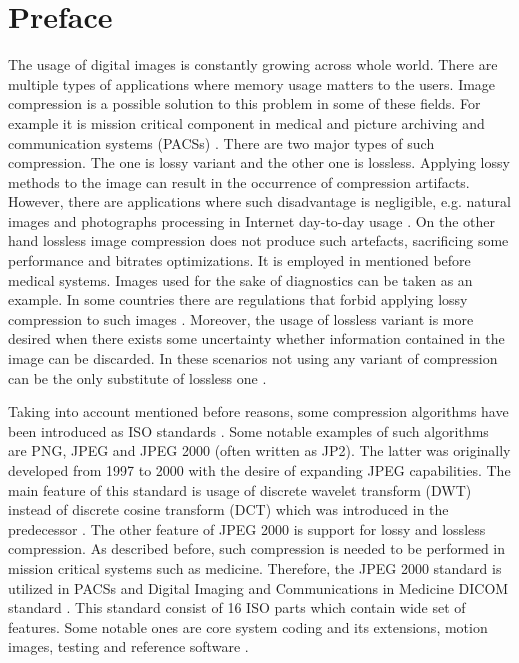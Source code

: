 \section{Preface}

The usage of digital images is constantly growing across whole world. There are multiple types
of applications where memory usage matters to the users. Image compression is a possible solution
to this problem in some of these fields. For example it is mission critical component in medical
and picture archiving and communication systems (PACSs) \cite{entropy}. There are two major types
of such compression. The one is lossy variant and the other one is lossless. Applying lossy methods
to the image can result in the occurrence of compression artifacts. However, there are applications
where such disadvantage is negligible, e.g. natural images and photographs processing in Internet day-to-day usage \cite{img_compress}.
On the other hand lossless image compression does not produce such artefacts,
sacrificing some performance and bitrates optimizations. It is employed in mentioned before medical systems.
Images used for the sake of diagnostics can be taken as an example. In some countries there are
regulations that forbid applying lossy compression to such images \cite{entropy}. Moreover, the
usage of lossless variant is more desired when there exists some uncertainty whether information
contained in the image can be discarded. In these scenarios not using any variant of compression
can be the only substitute of lossless one \cite{entropy}.

Taking into account mentioned before reasons, some compression algorithms have been introduced as ISO
standards \cite{entropy}. Some notable examples of such algorithms are PNG, JPEG and JPEG 2000 (often written as JP2).
The latter was originally developed from 1997 to 2000 with the desire of expanding JPEG capabilities.
The main feature of this standard is usage of discrete wavelet transform (DWT) instead of discrete
cosine transform (DCT) which was introduced in the predecessor \cite{jpeg2000}. The other feature
of JPEG 2000 is support for lossy and lossless compression. As described before, such compression
is needed to be performed in mission critical systems such as medicine. Therefore, the JPEG 2000 standard
is utilized in PACSs and Digital Imaging and Communications in Medicine DICOM standard \cite{entropy}.
This standard consist of 16 ISO parts which contain wide set of features. Some notable ones are core system
coding and its extensions, motion images, testing and reference software \cite{jpeg2000}.

